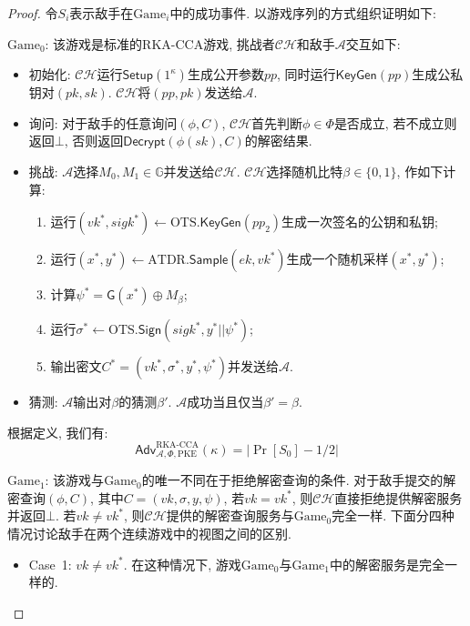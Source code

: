 \begin{proof}
令$S_i$表示敌手在$\text{Game}_i$中的成功事件. 以游戏序列的方式组织证明如下: 

\begin{trivlist}
\item $\text{Game}_0$: 该游戏是标准的RKA-CCA游戏, 挑战者$\mathcal{CH}$和敌手$\mathcal{A}$交互如下: 
\begin{itemize}
\item 初始化: $\mathcal{CH}$运行$\mathsf{Setup}(1^\kappa)$生成公开参数$pp$, 
		同时运行$\mathsf{KeyGen}(pp)$生成公私钥对$(pk, sk)$. $\mathcal{CH}$将$(pp, pk)$发送给$\mathcal{A}$. 

\item 询问: 对于敌手的任意询问$(\phi, C)$, $\mathcal{CH}$首先判断$\phi \in \Phi$是否成立, 若不成立则返回$\bot$, 否则返回$\mathsf{Decrypt}(\phi(sk), C)$的解密结果.  

\item 挑战: $\mathcal{A}$选择$M_0, M_1 \in \mathbb{G}$并发送给$\mathcal{CH}$. $\mathcal{CH}$选择随机比特$\beta \in \{0,1\}$, 作如下计算:
\begin{enumerate}
    \item 运行$(vk^*, sigk^*) \leftarrow \text{OTS}.\mathsf{KeyGen}(pp_2)$生成一次签名的公钥和私钥;
    \item 运行$(x^*, y^*) \leftarrow \text{ATDR}.\mathsf{Sample}(ek, vk^*)$生成一个随机采样$(x^*, y^*)$; 
    \item 计算$\psi^* = \mathsf{G}(x^*)\oplus M_\beta$;
    \item 运行$\sigma^* \leftarrow \text{OTS}.\mathsf{Sign}(sigk^*, y^*||\psi^*)$;
    \item 输出密文$C^* = (vk^*, \sigma^*, y^*, \psi^*)$并发送给$\mathcal{A}$. 
\end{enumerate} 

\item 猜测: $\mathcal{A}$输出对$\beta$的猜测$\beta'$. $\mathcal{A}$成功当且仅当$\beta' = \beta$. 
\end{itemize} 
根据定义, 我们有: 
\begin{equation*}
	\mathsf{Adv}_{\mathcal{A}, \Phi, \text{PKE}}^{\text{RKA-CCA}}(\kappa) = |\Pr[S_0] - 1/2|
\end{equation*}

\item $\text{Game}_1$: 该游戏与$\text{Game}_0$的唯一不同在于拒绝解密查询的条件.	对于敌手提交的解密查询$(\phi, C)$, 其中$C = (vk, \sigma, y, \psi)$, 若$vk = vk^*$, 则$\mathcal{CH}$直接拒绝提供解密服务并返回$\bot$. 若$vk \neq vk^*$, 则$\mathcal{CH}$提供的解密查询服务与$\text{Game}_0$完全一样. 下面分四种情况讨论敌手在两个连续游戏中的视图之间的区别.
\begin{itemize}
\item Case~1: $vk \neq vk^*$. 在这种情况下, 游戏$\text{Game}_0$与$\text{Game}_1$中的解密服务是完全一样的.


\end{itemize}
\end{trivlist}
\end{proof}
